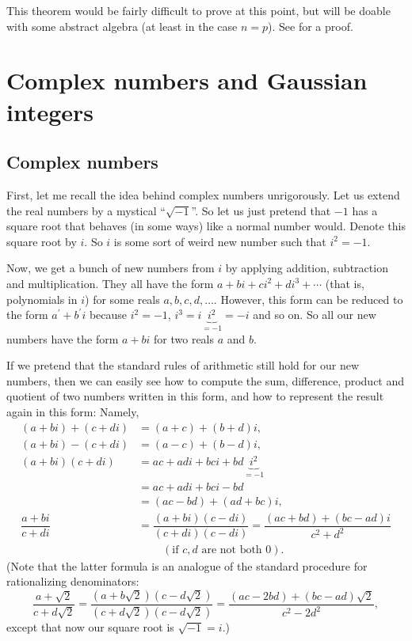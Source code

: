 \documentclass[numbers=enddot,12pt,final,onecolumn,notitlepage]{scrartcl}%
\numberwithin{exer}{subsection}
\theoremstyle{definition}
\begin{document}
This theorem would be fairly difficult to prove at this point, but will be
doable with some abstract algebra (at least in the case $n=p$). See
\cite[Chapter 4]{Gallier-RSA} for a proof.

\section{Complex numbers and Gaussian integers}

\subsection{Complex numbers}

First, let me recall the idea behind complex numbers unrigorously. Let us
extend the real numbers by a mystical \textquotedblleft$\sqrt{-1}%
$\textquotedblright. So let us just pretend that $-1$ has a square root that
behaves (in some ways) like a normal number would. Denote this square root by
$i$. So $i$ is some sort of weird new number such that $i^{2}=-1$.

Now, we get a bunch of new numbers from $i$ by applying addition, subtraction
and multiplication. They all have the form $a+bi+ci^{2}+di^{3}+\cdots$ (that
is, polynomials in $i$) for some reals $a,b,c,d,\ldots$. However, this form
can be reduced to the form $a^{\prime}+b^{\prime}i$ because $i^{2}=-1$,
$i^{3}=i\underbrace{i^{2}}_{=-1}=-i$ and so on. So all our new numbers have
the form $a+bi$ for two reals $a$ and $b$.

If we pretend that the standard rules of arithmetic still hold for our new
numbers, then we can easily see how to compute the sum, difference, product
and quotient of two numbers written in this form, and how to represent the
result again in this form: Namely,%
\begin{align*}
\left(  a+bi\right)  +\left(  c+di\right)   &  =\left(  a+c\right)  +\left(
b+d\right)  i,\\
\left(  a+bi\right)  -\left(  c+di\right)   &  =\left(  a-c\right)  +\left(
b-d\right)  i,\\
\left(  a+bi\right)  \left(  c+di\right)   &  =ac+adi+bci+bd\underbrace{i^{2}%
}_{=-1}\\
&  =ac+adi+bci-bd\\
&  =\left(  ac-bd\right)  +\left(  ad+bc\right)  i,\\
\dfrac{a+bi}{c+di}  &  =\dfrac{\left(  a+bi\right)  \left(  c-di\right)
}{\left(  c+di\right)  \left(  c-di\right)  }=\dfrac{\left(  ac+bd\right)
+\left(  bc-ad\right)  i}{c^{2}+d^{2}}\\
&  \ \ \ \ \ \ \ \ \ \ \left(  \text{if }c,d\text{ are not both }0\right)  .
\end{align*}
(Note that the latter formula is an analogue of the standard procedure for
rationalizing denominators:%
\[
\dfrac{a+\sqrt{2}}{c+d\sqrt{2}}=\dfrac{\left(  a+b\sqrt{2}\right)  \left(
c-d\sqrt{2}\right)  }{\left(  c+d\sqrt{2}\right)  \left(  c-d\sqrt{2}\right)
}=\dfrac{\left(  ac-2bd\right)  +\left(  bc-ad\right)  \sqrt{2}}{c^{2}-2d^{2}%
},
\]
except that now our square root is $\sqrt{-1}=i$.)
\end{document}
